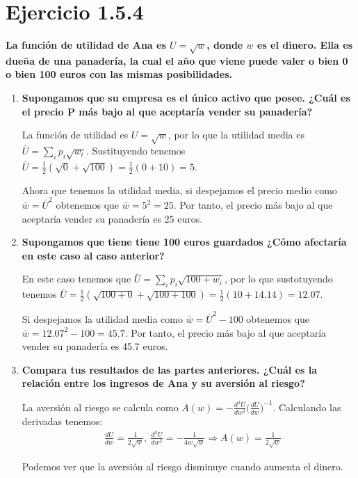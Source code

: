 \documentclass[12pt, letterpaper]{article}
\begin{document}
\section{Ejercicio 1.5.4}
\textbf{La función de utilidad de Ana es $U = \sqrt{w}$, donde $w$ es el
dinero. Ella es dueña de una panadería, la cual el año que viene puede valer
o bien 0 o bien 100 euros con las mismas posibilidades.}
\begin{enumerate}
    \item \textbf{Supongamos que su empresa es el único activo que posee. ¿Cuál es el precio P más bajo al que aceptaría vender su panadería?}

    La función de utilidad es $U = \sqrt{w}$, por lo que la utilidad media es $\bar{U} = \sum_i p_i\sqrt{w_i}$. Sustituyendo tenemos $\bar{U} = \frac{1}{2}(\sqrt{0} + \sqrt{100}) = \frac{1}{2}(0 + 10) = 5$. 

    Ahora que tenemos la utilidad media, si despejamos el precio medio como $\bar{w} = \bar{U}^2$ obtenemos que $\bar{w} = 5^2 = 25$. Por tanto, el precio más bajo al que aceptaría vender su panadería es 25 euros.

    \item \textbf{Supongamos que tiene tiene 100 euros guardados ¿Cómo afectaría en este caso al caso anterior?}
    
    En este caso tenemos que $\bar{U} = \sum_i p_i\sqrt{100 + w_i}$, por lo que sustotuyendo tenemos $\bar{U} = \frac{1}{2}(\sqrt{100 + 0} + \sqrt{100 + 100}) = \frac{1}{2}(10 + 14.14) = 12.07$. 

    Si despejamos la utilidad media como $\bar{w} = \bar{U}^2 - 100$ obtenemos que $\bar{w} = 12.07^2 - 100 = 45.7$. Por tanto, el precio más bajo al que aceptaría vender su panadería es 45.7 euros.

    \item\textbf{Compara tus resultados de las partes anteriores. ¿Cuál es la relación entre los ingresos de Ana y su aversión al riesgo?}
    
    La aversión al riesgo se calcula como $A(w) = -\frac{d^2U}{dw^2} {\big(\frac{dU}{dw}\big)}^{-1}$. Calculando las derivadas tenemos:
    \begin{align*}
        &   \frac{dU}{dw} = \frac{1}{2\sqrt{w}},\
        \frac{d^2U}{dw^2} = -\frac{1}{4w\sqrt{w}} \Rightarrow
        A(w) = \frac{1}{2\sqrt{w}}
    \end{align*}

    Podemos ver que la aversión al riesgo disminuye cuando aumenta el dinero.

\end{enumerate}
\end{document}
